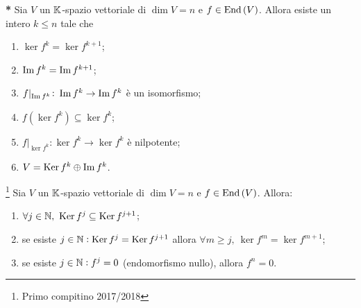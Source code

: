 
\begin{thm} \textbf{*}
	Sia $ V $ un $ \mathbb{K} $-spazio vettoriale di $ \dim{V} = n $ e $ f \in \operatorname{End}{(V)} $. Allora esiste un intero $ k \leq n $ tale che \begin{enumerate}[label = (\roman*)]
		\item $ \ker{f^{k}} = \ker{f^{k + 1}} $;
		\item $ \operatorname{Im}{f^{k}} = \operatorname{Im}{f^{k + 1}} $;
		\item $ f\lvert_{\operatorname{Im}{f^{k}}} \colon \operatorname{Im}{f^{k}} \to \operatorname{Im}{f^{k}} $ è un isomorfismo;
		\item $ f(\ker{f^{k}}) \subseteq \ker{f^{k}} $;
		\item $ f\lvert_{\ker{f^{k}}} \colon \ker{f^{k}} \to \ker{f^{k}} $ è nilpotente;
		\item $ V = \operatorname{Ker}{f^{k}} \oplus \operatorname{Im}{f^{k}} $.
	\end{enumerate}
\end{thm}

\begin{prop} \footnote{Primo compitino 2017/2018}
	Sia $ V $ un $ \mathbb{K} $-spazio vettoriale di $ \dim{V} = n $ e $ f \in \operatorname{End}{(V)} $. Allora:
	\begin{enumerate}
		\item $ \forall j \in \mathbb{N}, \ \operatorname{Ker}{f^{j}} \subseteq \operatorname{Ker}{f^{j + 1}} $;
		\item se esiste $ j \in \mathbb{N} : \operatorname{Ker}{f^{j}} = \operatorname{Ker}{f^{j + 1}} $ allora $ \forall m \geq j, \ \ker{f^{m}} = \ker{f^{m + 1}} $;
		\item se esiste $ j \in \mathbb{N} : f^{j} = 0 $ (endomorfismo nullo), allora $ f^{n} = 0 $. 
	\end{enumerate}
\end{prop}